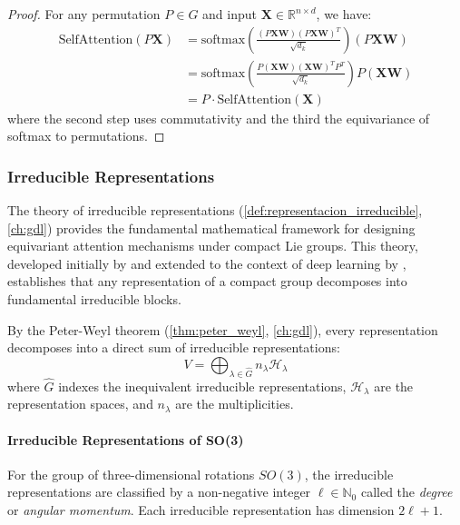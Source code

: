 \begin{proof}
For any permutation $P \in G$ and input $\mathbf{X} \in \mathbb{R}^{n \times d}$, we have:
\begin{align}
\text{SelfAttention}(P\mathbf{X}) &= \text{softmax}\left(\frac{(P\mathbf{X}\mathbf{W})(P\mathbf{X}\mathbf{W})^T}{\sqrt{d_k}}\right)(P\mathbf{X}\mathbf{W}) \\
&= \text{softmax}\left(\frac{P(\mathbf{X}\mathbf{W})(\mathbf{X}\mathbf{W})^T P^T}{\sqrt{d_k}}\right)P(\mathbf{X}\mathbf{W}) \\
&= P \cdot \text{SelfAttention}(\mathbf{X})
\end{align}
where the second step uses commutativity and the third the equivariance of softmax to permutations.
\end{proof}

\subsubsection{Irreducible Representations}

The theory of irreducible representations (\autoref{def:representacion_irreducible}, \autoref{ch:gdl}) provides the fundamental mathematical framework for designing equivariant attention mechanisms under compact Lie groups. This theory, developed initially by \citet{Peter1927} and extended to the context of deep learning by \citet{kondor2018generalizationconvolutionalneural}, establishes that any representation of a compact group decomposes into fundamental irreducible blocks.

By the Peter-Weyl theorem (\autoref{thm:peter_weyl}, \autoref{ch:gdl}), every representation decomposes into a direct sum of irreducible representations:
\begin{equation}
V = \bigoplus_{\lambda \in \widehat{G}} n_\lambda \mathcal{H}_\lambda
\label{eq:peter_weyl_decomposition_attention}
\end{equation}
where $\widehat{G}$ indexes the inequivalent irreducible representations, $\mathcal{H}_\lambda$ are the representation spaces, and $n_\lambda$ are the multiplicities.

\paragraph{Irreducible Representations of SO(3)}

For the group of three-dimensional rotations $SO(3)$, the irreducible representations are classified by a non-negative integer $\ell \in \mathbb{N}_0$ called the \textit{degree} or \textit{angular momentum}. Each irreducible representation has dimension $2\ell + 1$.

